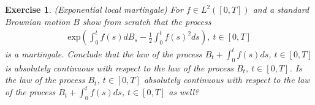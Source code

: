 \documentclass[12pt]{article}
\theoremstyle{colon}
\newtheorem{exercise}{Exercise}
\begin{document}
\clearpage

\begin{exercise}
  (Exponential local martingale) For $f \in L^2([0,T])$ and a standard Brownian motion $B$ show from scratch that the process
  \begin{gather*}
      \text{exp}(\int_0^t f(s) d B_s - \frac{1}{2} \int_0^t f(s)^2 ds), \ t \in [0,T]
  \end{gather*}
  is a martingale. Conclude that the law of the process $B_t + \int_0^t f(s) ds$, $t \in [0,T]$ is absolutely continuous with respect to the law of the process $B_t$, $t \in [0,T]$. Is the law of the process $B_t$, $t \in [0,T]$ absolutely continuous with respect to the law of the process $B_t + \int_0^t f(s) ds$, $t \in [0,T]$ as well?
\end{exercise}
\end{document}
